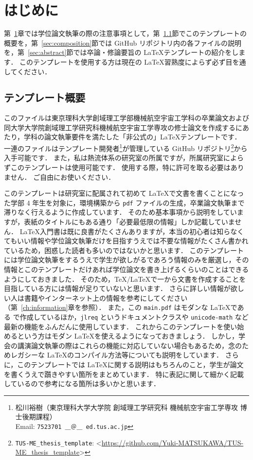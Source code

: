 \chapter{はじめに}
\label{ch:introduction}

第~\ref{ch:introduction}章では学位論文執筆の際の注意事項として，第~\ref{sec:template}節でこのテンプレートの概要を，第~\ref{sec:composition}節では GitHub リポジトリ内の各ファイルの説明を，第~\ref{sec:abstract}節では卒論・修論要旨の \LaTeX テンプレートの紹介をします．
このテンプレートを使用する方は現在の \LaTeX 習熟度によらず必ず目を通してください．

\section{テンプレート概要}
\label{sec:template}

このファイルは東京理科大学創域理工学部機械航空宇宙工学科の卒業論文および同大学大学院創域理工学研究科機械航空宇宙工学専攻の修士論文を作成するにあたり，学科の論文執筆要件を満たした「非公式の」\LaTeX テンプレートです．
一連のファイルはテンプレート開発者\footnote{松川裕樹（東京理科大学大学院 創域理工学研究科 機械航空宇宙工学専攻 博士後期課程）\\ \quad Email: \texttt{7523701 ＿＠＿ ed.tus.ac.jp}}が管理している GitHub リポジトリ\footnote{\texttt{TUS-ME\_thesis\_template}: \textless\url{https://github.com/Yuki-MATSUKAWA/TUS-ME_thesis_template}\textgreater}から入手可能です．
また，私は熱流体系の研究室の所属ですが，所属研究室によらずこのテンプレートは使用可能です．
使用する際，特に許可を取る必要はありません．
ご自由にお使いください．

このテンプレートは研究室に配属されて初めて \LaTeX で文書を書くことになった学部 4 年生を対象に，環境構築から \verb|pdf| ファイルの生成，卒業論文執筆まで滞りなく行えるように作成しています．
そのため基本事項から説明をしていますが，表紙のタイトルにもある通り「必要最低限の情報」しか記載していません．
\LaTeX 入門書は既に良書がたくさんありますが，本当の初心者は知らなくてもいい情報や学位論文執筆だけを目指すうえでは不要な情報がたくさん書かれているため，困惑した読者も多いのではないかと思います．
このテンプレートには学位論文執筆をするうえで学生が欲しがるであろう情報のみを厳選し，その情報とこのテンプレートだけあれば学位論文を書き上げるくらいのことはできるようにしておきました．
そのため，\TeX/\LaTeX で一から文書を作成することを目指している方には情報が足りていないと思います．
さらに詳しい情報が欲しい人は書籍やインターネット上の情報を参考にしてください（第~\ref{ch:information}章を参照）．
また，この \verb|main.pdf| はモダンな \LaTeX である \LuaLaTeX で作成しているほか，\verb|jlreq| というドキュメントクラスや \verb|unicode-math| など最新の機能をふんだんに使用しています．
これからこのテンプレートを使い始めるという方はモダン \LaTeX を使えるようになっておきましょう．
しかし，学会の講演論文執筆の際はこれらの機能に対応していない場合もあるため，念のためレガシーな \LaTeX のコンパイル方法等についても説明をしています．
さらに，このテンプレートでは \LaTeX に関する説明はもちろんのこと，学生が論文を書くうえで躓きやすい箇所をまとめています．
特に表記に関して細かく記載しているので参考になる箇所は多いかと思います．

